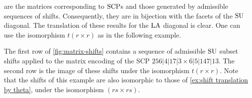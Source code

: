  \cite[Def. 7]{SaneblidzeUmble} are the matrices corresponding to $\mathrm{SCP}$s and those generated by admissible sequences of shifts.
Consequently, they are in bijection with the facets of the $\mathrm{SU}$ diagonal.
The translation of these results for the $\mathrm{LA}$ diagonal is clear.
One can use the isomorphism $t(r\times r)$ as in the following example. 

\begin{example}
\label{ex:matrix shifts}
The first row of \cref{fig:matrix-shifts} contains a sequence of admissible $\mathrm{SU}$ subset shifts applied to the matrix encoding of the SCP $256|4|17|3\times 6|5|147|13$. 
The second row is the image of these shifts under the isomorphism $t(r\times r)$.
Note that the shifts of this example are also isomorphic to those of \cref{ex:shift translation by theta}, under the isomorphism $(rs\times rs)$.
\end{example}
